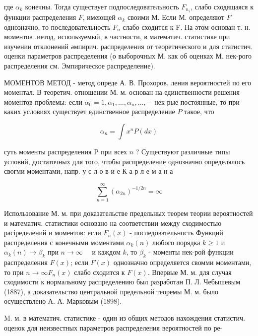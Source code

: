 \documentclass[10pt]{article}
\begin{document}
где $\alpha_{k}$ конечны. Тогда существует подпоследовательность $F_{n_{i}}$, слабо сходящаяся к функции распределения $F$, имеющей $\alpha_{k}$ своими М. Если М. определяют $F$ однозначно, то последовательность $F_{n}$ слабо сходится к F. На әтом основан т. н. моментов .иетод, используемый, в частности, в математич. статистике при изучении отклонений әмпирич. распределения от теоретического и для статистич. оценки параметров распределения (о выборочных М. как об оценках М. нек-рого распределения см. Эмпирическое распределение).



МОМЕНТОВ МЕТОД - метод опреде А. В. Прохоров. ления вероятностей по его моментал. В теоретич. отношении М. м. основан на единственности решения моментов проблемы: если $\alpha_{0}=1, \alpha_{1}, \ldots, \alpha_{n}, \ldots,-$ нек-рые постоянные, то при каких условиях существует единственное распределение $P$ такое, что



\[

\alpha_{n}=\int x^{n} P(d x)

\]



суть моменты распределения $\mathrm{P}$ при всех $n$ ? Существуют различные типы условий, достаточных для того, чтобы распределение однозначно определялось свогми моментами, напр. у с л о в и е К а р л е м а н а



\[

\sum_{n=1}^{\infty}\left(\alpha_{2 n}\right)^{-1 / 2 n}=\infty

\]



Использование М. м. при доказательстве предельных теорем теории вероятностей и математич. статистики основано на соответствии между сходимостью расіределений и моментов: если $F_{n}(x)$ - последовательность Функций распределения с конечными моментами $\alpha_{k}(n)$ любого порядка $k \geqslant 1$ и $\alpha_{k}(n) \rightarrow \beta_{k}$ при $n \rightarrow \infty \quad$ и каждом $k$, то $\beta_{k}$ - моменты нек-рой функции распределения $F(x)$; если $F(x)$ однозначно определяется свомми моментами, то при $n \rightarrow \infty F_{n}(x)$ слабо сходится к $F(x)$. Впервые М. м. для случая сходимости к нормальному распределению был разработан П. Л. Чебышевым (1887), а доказательство центральной предельной теоремы М. м. было осуществлено А. А. Марковым (1898).



M. м. в математич. статистике - один из общих методов нахождения статистич. оценок для неизвестных параметров распределения вероятностей по ре-
\end{document}
